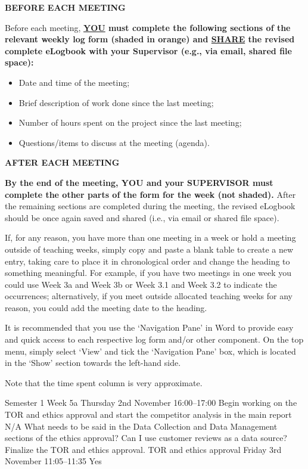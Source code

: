 \documentclass[../CHEFCookingHelper.tex]{subfiles}
\begin{document}
\textbf{BEFORE EACH MEETING}

Before each meeting, \textbf{\ul{YOU} must complete the following sections of the relevant weekly log form
(\colorbox{\logbookshadecolour}{shaded in orange}) and \ul{SHARE} the revised complete eLogbook with your Supervisor
(e.g., via email, shared file space):}

\begin{itemize}
    \item Date and time of the meeting;
    \item Brief description of work done since the last meeting;
    \item Number of hours spent on the project since the last meeting;
    \item Questions/items to discuss at the meeting (agenda).
\end{itemize}

\textbf{AFTER EACH MEETING}

\textbf{By the end of the meeting, YOU and your SUPERVISOR must complete the other parts of the form for the week
(not shaded).} After the remaining sections are completed during the meeting, the revised eLogbook should be once
again saved and shared (i.e., via email or shared file space).

If, for any reason, you have more than one meeting in a week or hold a meeting outside of teaching weeks,
simply copy and paste a blank table to create a new entry, taking care to place it in chronological order and
change the heading to something meaningful. For example, if you have two meetings in one week you could use
Week 3a and Week 3b or Week 3.1 and Week 3.2 to indicate the occurrences; alternatively, if you meet outside
allocated teaching weeks for any reason, you could add the meeting date to the heading.

It is recommended that you use the \enquote*{Navigation Pane} in Word to provide easy and quick access to each respective
log form and/or other component.  On the top menu, simply select \enquote*{View} and tick the \enquote*{Navigation Pane} box, which
is located in the \enquote*{Show} section towards the left-hand side.

Note that the time spent column is very approximate.

\logbookentry
{Semester 1 Week 5a}
{Thursday 2nd November 16:00--17:00}
{Begin working on the TOR and ethics approval and start the competitor analysis in the main report}
{N/A}
{What needs to be said in the Data Collection and Data Management sections of the ethics approval? Can I use customer reviews as a data source?}
{Finalize the TOR and ethics approval.}
{TOR and ethics approval}
{Friday 3rd November 11:05--11:35}
{Yes}
\end{document}
